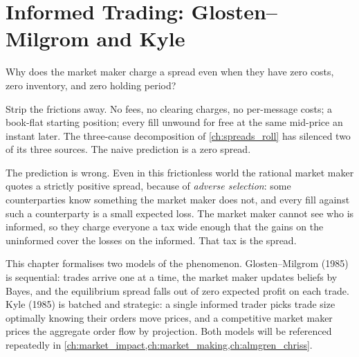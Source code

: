 \chapter{Informed Trading: Glosten--Milgrom and Kyle}
\label{ch:kyle_gm}

Why does the market maker charge a spread even when they have zero
costs, zero inventory, and zero holding period?

Strip the frictions away. No fees, no clearing charges, no
per-message costs; a book-flat starting position; every fill unwound
for free at the same mid-price an instant later. The three-cause
decomposition of \cref{ch:spreads_roll} has silenced two of its
three sources. The naive prediction is a zero spread.

The prediction is wrong. Even in this frictionless world the
rational market maker quotes a strictly positive spread, because of
\emph{adverse selection}: some counterparties know something the
market maker does not, and every fill against such a counterparty
is a small expected loss. The market maker cannot see who is
informed, so they charge everyone a tax wide enough that the gains
on the uninformed cover the losses on the informed. That tax is
the spread.

This chapter formalises two models of the phenomenon.
Glosten--Milgrom (1985) \citeGM{} is sequential: trades arrive one
at a time, the market maker updates beliefs by Bayes, and the
equilibrium spread falls out of zero expected profit on each
trade. Kyle (1985) \citeKyle{} is batched and strategic: a single
informed trader picks trade size optimally knowing their orders
move prices, and a competitive market maker prices the aggregate
order flow by projection. Both models will be referenced
repeatedly in \cref{ch:market_impact,ch:market_making,ch:almgren_chriss}.

